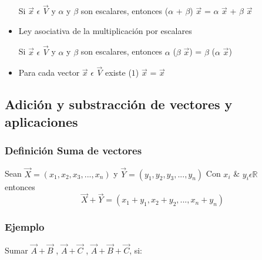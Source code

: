 \documentclass[12pt,openany]{book}
\begin{document}
\begin{itemize}
		         Si $\vec{x}$ $\epsilon$ $\vec{V}$ y $\alpha$ y $\beta$
		        son escalares, entonces ($\alpha$ + $\beta$) $\vec{x}$ =  $\alpha$
		        $\vec{x}$ + $\beta$ $\vec{x}$
		         
		        \item Ley asociativa de la multiplicaci\'on por escalares
		        
		        Si $\vec{x}$ $\epsilon$ $\vec{V}$ y $\alpha$ y $\beta$ 
		        son escalares, entonces $\alpha$ ($\beta$ $\vec{x}$) = $\beta$ 
		        ($\alpha$ $\vec{x}$)
		        
		        \item Para cada vector $\vec{x}$ $\epsilon$ $\vec{V}$
		        existe ($1$) $\vec{x}$ = $\vec{x}$
	    	
	        \end{itemize}

	    \subsection{Adici\'on y substracci\'on de vectores y aplicaciones}

	    	\subsubsection{Definici\'on Suma de vectores}
		    	 \noindent Sean $ \vec{X} = ( x_{1}, x_{2}, x_{3}, ..., x_{n})$ y $\vec{Y} = ( y_{1}, y_{2}, y_{3}, ..., y_{n}) $ Con  $x_{i}$ \& $y_{i} \epsilon \mathbb{R}$ \\
		    	entonces 
		    	$$\vec{X} + \vec{Y} = (x_{1} + y_{1} , x_{2} + y_{2}, ... , x_{n} + y_{n} )$$
	    	\subsubsection{Ejemplo}
	    	Sumar $\vec{A} + \vec{B}$ , $\vec{A} + \vec{C}$ ,
	    	$\vec{A} + \vec{B} + \vec{C}$, si:
\end{document}
